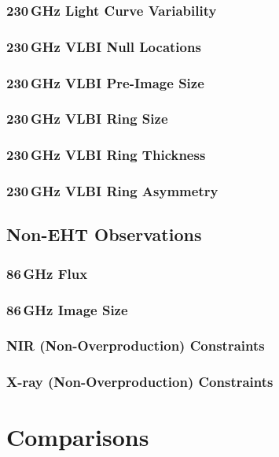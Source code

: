 \documentclass[twocolumn,twocolappendix,tighten,dvipsnames,linenumbers]{aastex63}
\begin{document}
\subsubsection{230\,GHz Light Curve Variability}
\subsubsection{230\,GHz VLBI Null Locations}
\subsubsection{230\,GHz VLBI Pre-Image Size}
\subsubsection{230\,GHz VLBI Ring Size}
\subsubsection{230\,GHz VLBI Ring Thickness}
\subsubsection{230\,GHz VLBI Ring Asymmetry}

\subsection{Non-EHT Observations}
\subsubsection{86\,GHz Flux}
\subsubsection{86\,GHz Image Size}
\subsubsection{NIR (Non-Overproduction) Constraints}
\subsubsection{X-ray (Non-Overproduction) Constraints}

\clearpage

\section{Comparisons}
\end{document}
